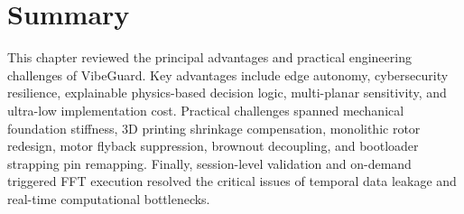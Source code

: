 \section{Summary}
This chapter reviewed the principal advantages and practical engineering challenges of VibeGuard. Key advantages include edge autonomy, cybersecurity resilience, explainable physics-based decision logic, multi-planar sensitivity, and ultra-low implementation cost. Practical challenges spanned mechanical foundation stiffness, 3D printing shrinkage compensation, monolithic rotor redesign, motor flyback suppression, brownout decoupling, and bootloader strapping pin remapping. Finally, session-level validation and on-demand triggered FFT execution resolved the critical issues of temporal data leakage and real-time computational bottlenecks.
